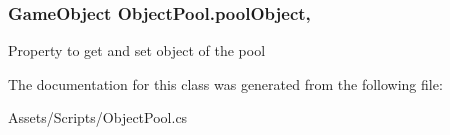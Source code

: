 \subsubsection[{\texorpdfstring{pool\+Object}{poolObject}}]{\setlength{\rightskip}{0pt plus 5cm}Game\+Object Object\+Pool.\+pool\+Object\hspace{0.3cm}{\ttfamily [get]}, {\ttfamily [set]}}\hypertarget{class_object_pool_aff4a0bc1bec2c6575f8df0f7e9fd62f4}{}\label{class_object_pool_aff4a0bc1bec2c6575f8df0f7e9fd62f4}


Property to get and set object of the pool 



The documentation for this class was generated from the following file\+:\begin{DoxyCompactItemize}
\item 
Assets/\+Scripts/Object\+Pool.\+cs\end{DoxyCompactItemize}
